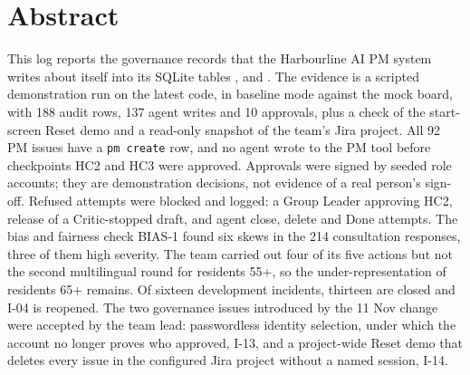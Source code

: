 \chapter*{Abstract}
This log reports the governance records that the Harbourline AI PM system writes about itself into its SQLite tables ,  and . The evidence is a scripted demonstration run on the latest code, in baseline mode against the mock board, with 188 audit rows, 137 agent writes and 10 approvals, plus a check of the start-screen Reset demo and a read-only snapshot of the team's Jira project. All 92 PM issues have a \texttt{pm create} row, and no agent wrote to the PM tool before checkpoints HC2 and HC3 were approved. Approvals were signed by seeded role accounts; they are demonstration decisions, not evidence of a real person's sign-off. Refused attempts were blocked and logged: a Group Leader approving HC2, release of a Critic-stopped draft, and agent close, delete and Done attempts. The bias and fairness check BIAS-1 found six skews in the 214 consultation responses, three of them high severity. The team carried out four of its five actions but not the second multilingual round for residents 55+, so the under-representation of residents 65+ remains. Of sixteen development incidents, thirteen are closed and I-04 is reopened. The two governance issues introduced by the 11 Nov change were accepted by the team lead: passwordless identity selection, under which the account no longer proves who approved, I-13, and a project-wide Reset demo that deletes every issue in the configured Jira project without a named session, I-14.
